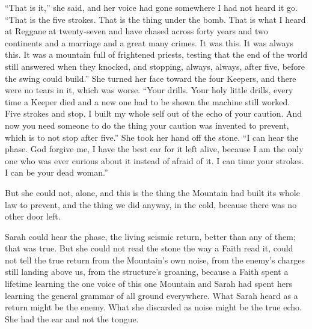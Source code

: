 ``That is it,'' she said, and her voice had gone somewhere I had not heard it go. ``That is the five strokes. That is the thing under the bomb. That is what I heard at Reggane at twenty-seven and have chased across forty years and two continents and a marriage and a great many crimes. It was this. It was always this. It was a mountain full of frightened priests, testing that the end of the world still answered when they knocked, and stopping, always, always, after five, before the swing could build.'' She turned her face toward the four Keepers, and there were no tears in it, which was worse. ``Your drills. Your holy little drills, every time a Keeper died and a new one had to be shown the machine still worked. Five strokes and stop. I built my whole self out of the echo of your caution. And now you need someone to do the thing your caution was invented to prevent, which is to not stop after five.'' She took her hand off the stone. ``I can hear the phase. God forgive me, I have the best ear for it left alive, because I am the only one who was ever curious about it instead of afraid of it. I can time your strokes. I can be your dead woman.''\par

\ornament

But she could not, alone, and this is the thing the Mountain had built its whole law to prevent, and the thing we did anyway, in the cold, because there was no other door left.\par

Sarah could hear the phase, the living seismic return, better than any of them; that was true. But she could not read the stone the way a Faith read it, could not tell the true return from the Mountain's own noise, from the enemy's charges still landing above us, from the structure's groaning, because a Faith spent a lifetime learning the one voice of this one Mountain and Sarah had spent hers learning the general grammar of all ground everywhere. What Sarah heard as a return might be the enemy. What she discarded as noise might be the true echo. She had the ear and not the tongue.\par

